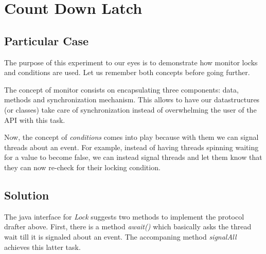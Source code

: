 \section{\textbf{Count Down Latch}}
\subsection{Particular Case}
\par
The purpose of this experiment to our eyes is to demonstrate how monitor locks and conditions are used. Let us remember both concepts before going further.
\par
The concept of monitor consists on encapsulating three components: data, methods and synchronization mechanism. This allows to have our datastructures (or classes) take care of synchronization instead of overwhelming the user of the API with this task. \par
Now, the concept of \textit{conditions} comes into play because with them we can signal threads about an event. For example, instead of having threads spinning waiting for a value to become false, we can instead signal threads and let them know that they can now re-check for their locking condition.
\par
\subsection{Solution}
\par
The java interface for \textit{Lock} suggests two methods to implement the protocol drafter above. First, there is a method \textit{await()} which basically asks the thread wait till it is signaled about an event. The accompaning method \textit{signalAll} achieves this latter task.
\par
